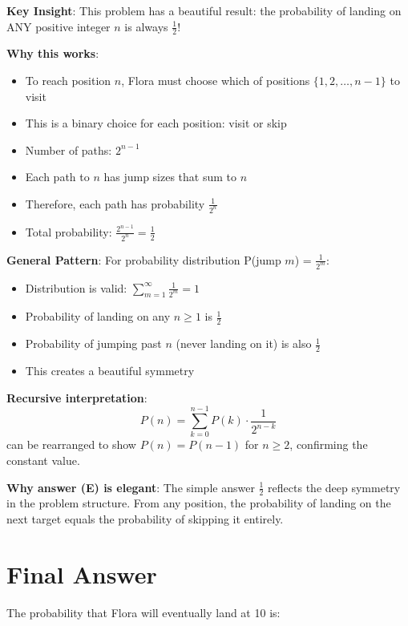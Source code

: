 \documentclass[11pt]{article}
\begin{document}
\begin{keyinsightbox}
\textbf{Key Insight}: This problem has a beautiful result: the probability of landing on ANY positive integer $n$ is always $\frac{1}{2}$!

\textbf{Why this works}:
\begin{itemize}
    \item To reach position $n$, Flora must choose which of positions $\{1, 2, \ldots, n-1\}$ to visit
    \item This is a binary choice for each position: visit or skip
    \item Number of paths: $2^{n-1}$
    \item Each path to $n$ has jump sizes that sum to $n$
    \item Therefore, each path has probability $\frac{1}{2^n}$
    \item Total probability: $\frac{2^{n-1}}{2^n} = \frac{1}{2}$
\end{itemize}

\textbf{General Pattern}: For probability distribution P(jump $m$) = $\frac{1}{2^m}$:
\begin{itemize}
    \item Distribution is valid: $\sum_{m=1}^{\infty} \frac{1}{2^m} = 1$
    \item Probability of landing on any $n \geq 1$ is $\frac{1}{2}$
    \item Probability of jumping past $n$ (never landing on it) is also $\frac{1}{2}$
    \item This creates a beautiful symmetry
\end{itemize}

\textbf{Recursive interpretation}:
\[P(n) = \sum_{k=0}^{n-1} P(k) \cdot \frac{1}{2^{n-k}}\]
can be rearranged to show $P(n) = P(n-1)$ for $n \geq 2$, confirming the constant value.

\textbf{Why answer (E) is elegant}: The simple answer $\frac{1}{2}$ reflects the deep symmetry in the problem structure. From any position, the probability of landing on the next target equals the probability of skipping it entirely.
\end{keyinsightbox}

\section*{Final Answer}

The probability that Flora will eventually land at 10 is:
\end{document}
